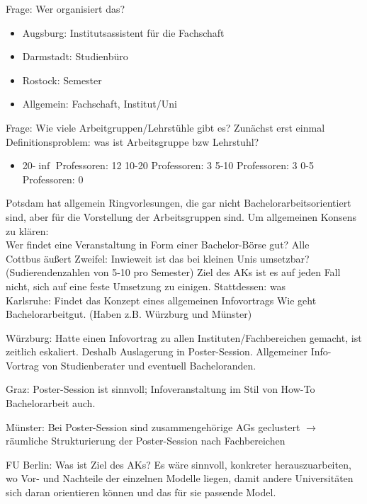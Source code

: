     Frage: Wer organisiert das? \\
    \begin{itemize}
      \item Augsburg: Institutsassistent für die Fachschaft
      \item Darmstadt: Studienbüro
      \item Rostock: Semester
      \item Allgemein: Fachschaft, Institut/Uni
    \end{itemize}

    Frage: Wie viele Arbeitgruppen/Lehrstühle gibt es? Zunächst erst einmal Definitionsproblem: was ist Arbeitsgruppe bzw Lehrstuhl?
    \begin{itemize}
      \item 20-$\inf$ Professoren: 12
      10-20 Professoren: 3
      5-10 Professoren: 3
      0-5 Professoren: 0
    \end{itemize}

    Potsdam hat allgemein Ringvorlesungen, die gar nicht Bachelorarbeitsorientiert sind, aber für die Vorstellung der Arbeitsgruppen sind.
    Um allgemeinen Konsens zu klären: \\
    Wer findet eine Veranstaltung in Form einer Bachelor-Börse gut? Alle \\

    Cottbus äußert Zweifel: Inwieweit ist das bei kleinen Unis umsetzbar? (Sudierendenzahlen von 5-10 pro Semester)
    Ziel des AKs ist es auf jeden Fall nicht, sich auf eine feste Umsetzung zu einigen. Stattdessen: was \\

    Karlsruhe: Findet das Konzept eines allgemeinen Infovortrags \flqq Wie geht Bachelorarbeit\frqq gut. (Haben z.B. Würzburg und Münster)

    Würzburg: Hatte einen Infovortrag zu allen Instituten/Fachbereichen gemacht, ist zeitlich eskaliert. Deshalb Auslagerung in Poster-Session. Allgemeiner Info-Vortrag von Studienberater und eventuell Bacheloranden.

    Graz: Poster-Session ist sinnvoll; Infoveranstaltung im Stil von \flqq How-To Bachelorarbeit \frqq auch.

    Münster: Bei Poster-Session sind zusammengehörige AGs geclustert $\rightarrow$ räumliche Strukturierung der Poster-Session nach Fachbereichen

    FU Berlin: Was ist Ziel des AKs? Es wäre sinnvoll, konkreter herauszuarbeiten, wo Vor- und Nachteile der einzelnen Modelle liegen, damit andere Universitäten sich daran orientieren können und das für sie passende Model.

